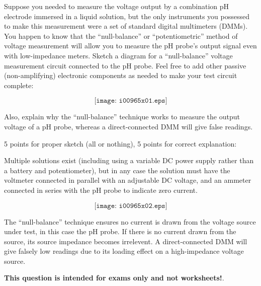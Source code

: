 

Suppose you needed to measure the voltage output by a combination pH electrode immersed in a liquid solution, but the only instruments you possessed to make this measurement were a set of standard digital multimeters (DMMs).  You happen to know that the ``null-balance'' or ``potentiometric'' method of voltage measurement will allow you to measure the pH probe's output signal even with low-impedance meters.  Sketch a diagram for a ``null-balance'' voltage measurement circuit connected to the pH probe.  Feel free to add other passive (non-amplifying) electronic components as needed to make your test circuit complete:

$$\texttt{[image: i00965x01.eps]}$$

Also, explain why the ``null-balance'' technique works to measure the output voltage of a pH probe, whereas a direct-connected DMM will give false readings.







5 points for proper sketch (all or nothing), 5 points for correct explanation:

\vskip 10pt

Multiple solutions exist (including using a variable DC power supply rather than a battery and potentiometer), but in any case the solution must have the voltmeter connected in parallel with an adjustable DC voltage, and an ammeter connected in series with the pH probe to indicate zero current.
 
$$\texttt{[image: i00965x02.eps]}$$

\vskip 10pt

The ``null-balance'' technique ensures no current is drawn from the voltage source under test, in this case the pH probe.  If there is no current drawn from the source, its source impedance becomes irrelevent.  A direct-connected DMM will give falsely low readings due to its loading effect on a high-impedance voltage source.







{\bf This question is intended for exams only and not worksheets!}.



